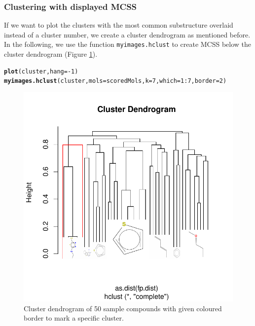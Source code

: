 \documentclass[12pt, a4paper]{scrartcl}\usepackage[]{graphicx}\usepackage[]{color}
\makeatletter
\def\maxwidth{ %
  \ifdim\Gin@nat@width>\linewidth
    \linewidth
  \else
    \Gin@nat@width
  \fi
}
\newcommand{\hlnum}[1]{\textcolor[rgb]{0.686,0.059,0.569}{#1}}%
\newcommand{\hlopt}[1]{\textcolor[rgb]{0,0,0}{#1}}%
\newcommand{\hlstd}[1]{\textcolor[rgb]{0.345,0.345,0.345}{#1}}%
\newcommand{\hlkwc}[1]{\textcolor[rgb]{0.333,0.667,0.333}{#1}}%
\newcommand{\hlkwd}[1]{\textcolor[rgb]{0.737,0.353,0.396}{\textbf{#1}}}%
\newenvironment{kframe}{%
 \def\at@end@of@kframe{}%
 \ifinner\ifhmode%
  \def\at@end@of@kframe{\end{minipage}}%
  \begin{minipage}{\columnwidth}%
 \fi\fi%
 \def\FrameCommand##1{\hskip\@totalleftmargin \hskip-\fboxsep
 \colorbox{shadecolor}{##1}\hskip-\fboxsep
     \hskip-\linewidth \hskip-\@totalleftmargin \hskip\columnwidth}%
 \MakeFramed {\advance\hsize-\width
   \@totalleftmargin\z@ \linewidth\hsize
   \@setminipage}}%
 {\par\unskip\endMakeFramed%
 \at@end@of@kframe}
\newenvironment{knitrout}{}{} %
\newcommand{\Rfunction}[1]{{\texttt{#1}}}
\makeatother
\begin{document}
\newpage
\subsubsection{Clustering with displayed MCSS}
If we want to plot the clusters with the most common substructure overlaid instead of a cluster
number, we create a cluster dendrogram as mentioned before. In the following, we use the function 
\Rfunction{myimages.hclust} to create MCSS below the cluster dendrogram (Figure \ref{fig:plotMCSSDendrogram}).

\begin{knitrout}
\color{fgcolor}\begin{kframe}
\begin{alltt}
\hlkwd{plot}\hlstd{(cluster,} \hlkwc{hang}\hlstd{=}\hlopt{-}\hlnum{1}\hlstd{)}
\hlkwd{myimages.hclust}\hlstd{(cluster,} \hlkwc{mols}\hlstd{=scoredMols,} \hlkwc{k}\hlstd{=}\hlnum{7}\hlstd{,} \hlkwc{which}\hlstd{=}\hlnum{1}\hlopt{:}\hlnum{7}\hlstd{,} \hlkwc{border}\hlstd{=}\hlnum{2}\hlstd{)}
\end{alltt}
\end{kframe}\begin{figure}[h!]


{\centering \includegraphics[width=\maxwidth]{figure/plotMCSSDendrogram} 

}

\caption[Cluster dendrogram of 50 sample compounds with given coloured border to mark a specific cluster]{Cluster dendrogram of 50 sample compounds with given coloured border to mark a specific cluster.\label{fig:plotMCSSDendrogram}}
\end{figure}


\end{knitrout}
\end{document}
